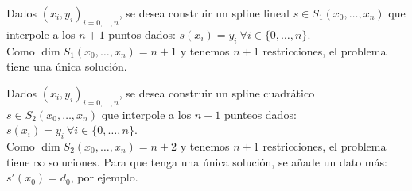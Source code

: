 \begin{ejemplo}
    Dados $(x_i, y_i)_{i = 0, \ldots, n}$, se desea construir un spline lineal $s \in S_1(x_0, \ldots, x_n)$
que interpole a los $n+1$ puntos dados: $s(x_i)=y_i~\forall i \in \{0, \ldots, n\}$.\\

\noindent
Como $\dim S_1(x_0, \ldots, x_n) = n+1$ y tenemos $n+1$ restricciones, el problema tiene una única solución.
\end{ejemplo}

\begin{ejemplo}
    Dados $(x_i, y_i)_{i=0, \ldots, n}$, se desea construir un spline cuadrático $s \in S_2(x_0, \ldots, x_n)$
que interpole a los $n+1$ punteos dados: $s(x_i)=y_i~\forall i \in \{0, \ldots, n\}$.\\

\noindent
Como $\dim S_2(x_0, \ldots, x_n)=n+2$ y tenemos $n+1$ restricciones, el problema tiene $\infty$ soluciones.
Para que tenga una única solución, se añade un dato más: $s'(x_0)=d_0$, por ejemplo.
\end{ejemplo}

